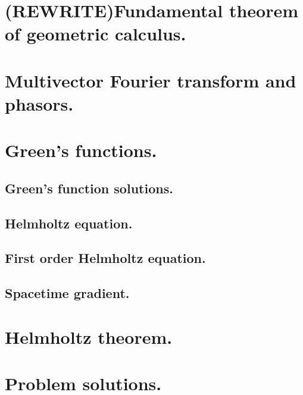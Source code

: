    \section{(REWRITE)Fundamental theorem of geometric calculus.}
      
   \section{Multivector Fourier transform and phasors.}
      
   \section{Green's functions.}
      
      \subsection{Green's function solutions.}
         
      \subsection{Helmholtz equation.}
         
      \subsection{First order Helmholtz equation.}
         
      \subsection{Spacetime gradient.}
         
   \section{Helmholtz theorem.}
      
      
   \section{Problem solutions.}
      \shipoutAnswer

